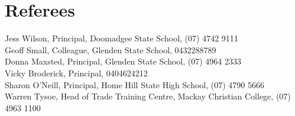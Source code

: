\documentclass[11pt,a4paper]{article}
\begin{document}
\section*{Referees}
Jess Wilson, Principal, Doomadgee State School, (07) 4742 9111 \\
Geoff Small, Colleague, Glenden State School, 0432288789 \\
Donna Maxsted, Principal, Glenden State School, (07) 4964 2333 \\
Vicky Broderick, Principal, 0404624212 \\
Sharon O'Neill, Principal, Home Hill State High School, (07) 4790 5666 \\
Warren Tysoe, Head of Trade Training Centre, Mackay Christian College, (07) 4963 1100
\end{document}
